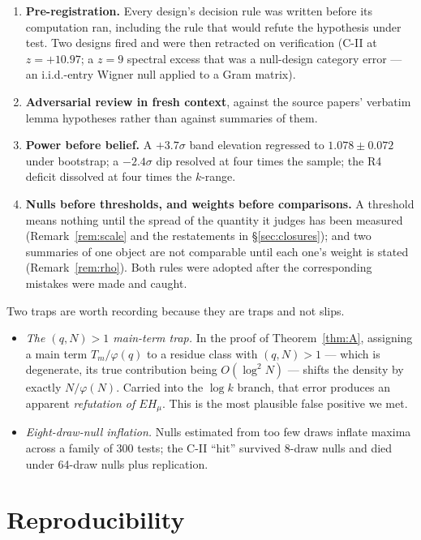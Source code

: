 \documentclass[11pt,a4paper]{article}
\theoremstyle{plain}
\theoremstyle{definition}
\begin{document}
\begin{enumerate}
\item \textbf{Pre-registration.} Every design's decision rule was
  written before its computation ran, including the rule that would
  refute the hypothesis under test. Two designs fired and were then
  retracted on verification (C-II at $z = +10.97$; a $z = 9$ spectral
  excess that was a null-design category error --- an i.i.d.-entry
  Wigner null applied to a Gram matrix).
\item \textbf{Adversarial review in fresh context}, against the source
  papers' verbatim lemma hypotheses rather than against summaries of
  them.
\item \textbf{Power before belief.} A $+3.7\sigma$ band elevation
  regressed to $1.078\pm0.072$ under bootstrap; a $-2.4\sigma$ dip
  resolved at four times the sample; the R4 deficit dissolved at four
  times the $k$-range.
\item \textbf{Nulls before thresholds, and weights before
  comparisons.} A threshold means nothing until the spread of the
  quantity it judges has been measured (Remark~\ref{rem:scale} and the
  restatements in \S\ref{sec:closures}); and two summaries of one
  object are not comparable until each one's weight is stated
  (Remark~\ref{rem:rho}). Both rules were adopted after the
  corresponding mistakes were made and caught.
\end{enumerate}

\noindent
Two traps are worth recording because they are traps and not slips.

\begin{itemize}
\item \emph{The $(q,N)>1$ main-term trap.} In the proof of
  Theorem~\ref{thm:A}, assigning a main term $T_m/\varphi(q)$ to a
  residue class with $(q,N)>1$ --- which is degenerate, its true
  contribution being $O(\log^2 N)$ --- shifts the density by exactly
  $N/\varphi(N)$. Carried into the $\log k$ branch, that error
  produces an apparent \emph{refutation of $EH_\mu$}. This is the most
  plausible false positive we met.
\item \emph{Eight-draw-null inflation.} Nulls estimated from too few
  draws inflate maxima across a family of 300 tests; the C-II ``hit''
  survived 8-draw nulls and died under 64-draw nulls plus replication.
\end{itemize}

\section{Reproducibility}
\end{document}
